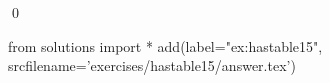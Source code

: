 
\begin{ex} 
  \label{ex:hastable15}
  
  \qed
\end{ex} 
\begin{python0}
from solutions import *
add(label="ex:hastable15",
    srcfilename='exercises/hastable15/answer.tex') 
\end{python0}
